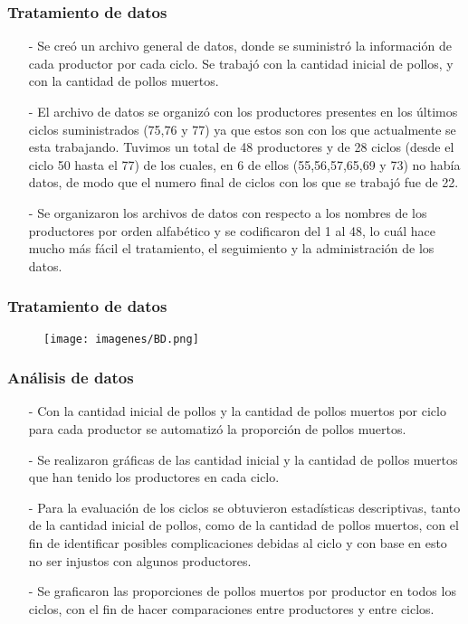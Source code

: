 \documentclass[11pt]{beamer}
\begin{document}
\begin{frame}
\frametitle{Tratamiento de datos}
\begin{itemize}
\justifying
\item[-]Se creó un archivo general de datos, donde se suministró la información de cada productor por cada ciclo. Se trabajó con la cantidad inicial de pollos, y con la cantidad de pollos muertos.
\item[-]El archivo de datos se organizó con los productores presentes en los últimos ciclos suministrados (75,76 y 77) ya que estos son con los que actualmente se esta trabajando. Tuvimos un total de 48 productores y de 28 ciclos (desde el ciclo 50 hasta el 77) de los cuales, en 6 de ellos (55,56,57,65,69 y 73) no había datos, de modo que el numero final de ciclos con los que se trabajó fue de 22.
\item[-]Se organizaron los archivos de datos con respecto a los nombres de los productores por orden alfabético y se codificaron del 1 al 48, lo cuál hace mucho más fácil el tratamiento, el seguimiento y la administración de los datos.
\end{itemize}
\end{frame}

\begin{frame}
\frametitle{Tratamiento de datos}
\begin{figure}[!h]
        \texttt{[image: imagenes/BD.png]}
        \label{figura1}
\end{figure}
\end{frame}


\begin{frame}
\frametitle{Análisis de datos}
\begin{itemize}
\justifying
\item[-]Con la cantidad inicial de pollos y la cantidad de pollos muertos por ciclo para cada productor se automatizó la proporción de pollos muertos.
\item[-]Se realizaron gráficas de las cantidad inicial y la cantidad de pollos muertos que han tenido los productores en cada ciclo.
\item[-]Para la evaluación de los ciclos se obtuvieron estadísticas descriptivas, tanto de la cantidad inicial de pollos, como de la cantidad de pollos muertos, con el fin de identificar posibles complicaciones debidas al ciclo y con base en esto no ser injustos con algunos productores.
\item[-]Se graficaron las proporciones de pollos muertos por productor en todos los ciclos, con el fin de hacer comparaciones entre productores y entre ciclos.
\end{itemize}
\end{frame}
\end{document}
